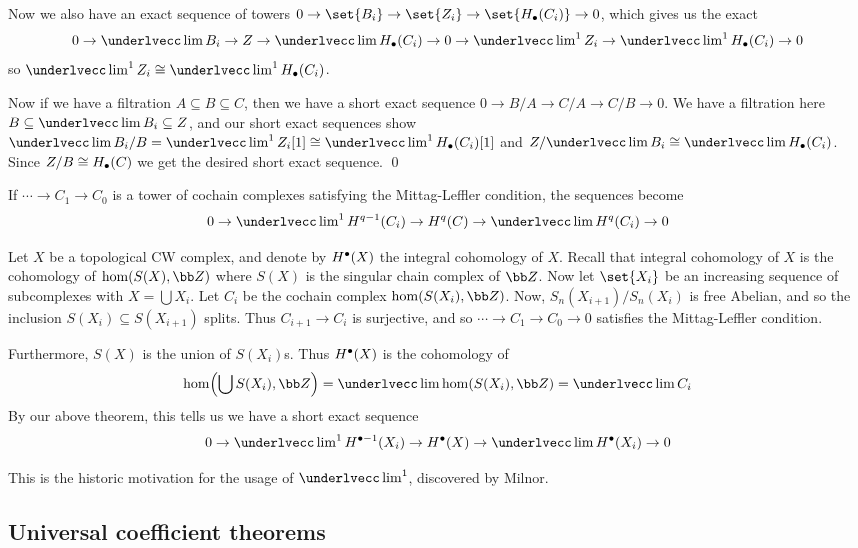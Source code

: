     Now we also have an exact sequence of towers $0\to\set{B_i}\to\set{Z_i}\to\set{H_\bul(C_i)}\to0$, which gives us the exact
    $$ 0 \to \ilim B_i \to Z \to \ilim H_\bul(C_i) \to 0 \to \ilim^1Z_i \to \ilim^1H_\bul(C_i) \to 0 $$
    so $\ilim^1Z_i\cong\ilim^1H_\bul(C_i)$.

    Now if we have a filtration $A\subseteq B\subseteq C$, then we have a short exact sequence $0\to B/A\to C/A\to C/B\to0$.
    We have a filtration here $B\subseteq\ilim B_i\subseteq Z$, and our short exact sequences show $\ilim B_i/B=\ilim^1Z_i[1]\cong\ilim^1H_\bul(C_i)[1]$
    and $Z/\ilim B_i\cong\ilim H_\bul(C_i)$.
    Since $Z/B\cong H_\bullet(C)$ we get the desired short exact sequence.
    \qed

\eproof

\bcoro

    If $\cdots\to C_1\to C_0$ is a tower of cochain complexes satisfying the Mittag-Leffler condition, the sequences become
    $$ 0 \to \ilim^1H^{q-1}(C_i) \to H^q(C) \to \ilim H^q(C_i) \to 0 $$

\ecoro

\bexam

    Let $X$ be a topological CW complex, and denote by $H^\bullet(X)$ the integral cohomology of $X$.
    Recall that integral cohomology of $X$ is the cohomology of $\hom(S(X),\bZ)$ where $S(X)$ is the singular chain complex of $\bZ$.
    Now let $\set{X_i}$ be an increasing sequence of subcomplexes with $X=\bigcup X_i$.
    Let $C_i$ be the cochain complex $\hom(S(X_i),\bZ)$.
    Now, $S_n(X_{i+1})/S_n(X_i)$ is free Abelian, and so the inclusion $S(X_i)\subseteq S(X_{i+1})$ splits.
    Thus $C_{i+1}\to C_i$ is surjective, and so $\cdots\to C_1\to C_0\to0$ satisfies the Mittag-Leffler condition.

    Furthermore, $S(X)$ is the union of $S(X_i)$s.
    Thus $H^\bullet(X)$ is the cohomology of
    $$ \hom\parens{\bigcup S(X_i),\bZ} = \ilim\hom(S(X_i),\bZ) = \ilim C_i $$
    By our above theorem, this tells us we have a short exact sequence
    $$ 0 \to \ilim^1H^{\bul-1}(X_i) \to H^\bul(X) \to \ilim H^\bul(X_i) \to 0 $$

    This is the historic motivation for the usage of $\ilim^1$, discovered by Milnor.

\eexam

\subsection{Universal coefficient theorems}

